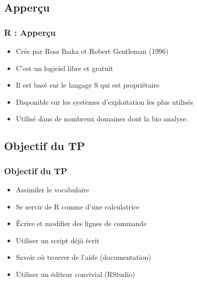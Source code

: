 \documentclass{beamer}
\begin{document}
\subsection{Apperçu}

\begin{frame}
	\frametitle{R : Apperçu}
	\begin{center}
		\begin{block}{}
			\begin{itemize}
				\item Crée par Ross Ihaka et Robert Gentleman (1996)
				\item C'est un logiciel libre et gratuit
				\item Il est basé sur le langage S qui est propriétaire
				\item Disponible sur les systèmes d'exploitation les plus utilisés
				\item Utilisé dans de nombreux domaines dont la bio analyse.
			\end{itemize}
		\end{block}
	\end{center}
\end{frame}

\subsection{Objectif du TP}
\begin{frame}
	\frametitle{Objectif du TP}
		
	\begin{itemize}[<+->]
		\item {Assimiler le vocabulaire }
		\item {Se servir de R comme d'une calculatrice}
		\item {Écrire et modifier des lignes de commande}
		\item {Utiliser un script déjà écrit}
		\item {Savoir où trouver de l'aide (documentation)}
		\item {Utiliser un éditeur convivial (RStudio)}%
	\end{itemize}
\end{frame}
\end{document}

